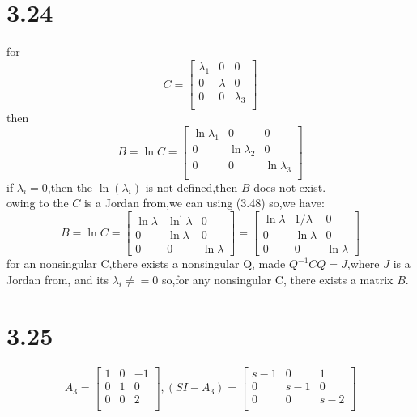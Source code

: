 \documentclass{article}
\begin{document}
\section*{3.24}
for
\[C=
\left[
\begin{array}{ccc}
\lambda_1 & 0 & 0\\
0 & \lambda & 0\\
0 & 0 & \lambda_3\\
\end{array}
\right]
\]
then
\[B=\ln{C}=
\left[
\begin{array}{ccc}
\ln{\lambda_1} & 0 & 0\\
0 & \ln{\lambda_2} & 0\\
0 & 0 & \ln{\lambda_3}\\
\end{array}
\right]
\]
if $\lambda_i=0$,then the $\ln(\lambda_i)$ is not defined,then $B$ does not exist.\\
owing to the $C$ is a Jordan from,we can using (3.48)
so,we have:
\[
B=\ln C=\left[\begin{array}{ccc}
\ln \lambda & \ln ^{\prime} \lambda & 0 \\
0 & \ln \lambda & 0 \\
0 & 0 & \ln \lambda
\end{array}\right]=\left[\begin{array}{ccc}
\ln \lambda & 1 / \lambda & 0 \\
0 & \ln \lambda & 0 \\
0 & 0 & \ln \lambda
\end{array}\right]   
\]
for an nonsingular C,there exists a nonsingular Q,
made $Q^{-1}CQ=J$,where $J$ is a Jordan from, and its $\lambda_i \neq=0$ 
so,for any nonsingular C, there exists a matrix $B$.

\section*{3.25}
\[A_3=
\left[
\begin{array}{ccc}
1 & 0 & -1\\
0 & 1 & 0\\
0 & 0 & 2\\
\end{array}
\right],
(SI-A_3)=
\left[
\begin{array}{ccc}
s-1 & 0 & 1\\
0 & s-1 & 0\\
0 & 0 & s-2\\
\end{array}
\right]
\]
\end{document}
